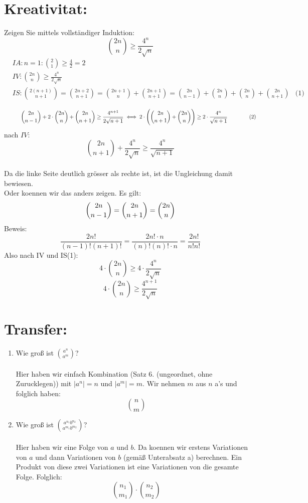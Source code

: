     \section*{Kreativitat:} 
    Zeigen Sie mittels vollständiger Induktion:
    \[\binom{2n}{n}\geq \frac{4^n}{2\sqrt n}\]
    \begin{align*}
        &IA: n=1: \binom{2}{1}\geq \frac{4}{2} = 2\\ %
        &IV: \binom{2n}{n}\geq \frac{4^n}{2\sqrt n}\\
        &IS: \binom{2(n+1)}{n+1}=\binom{2n+2}{n+1}
        = \binom{2n+1}{n} + \binom{2n+1}{n+1}
        = \binom{2n}{n-1} + \binom{2n}{n} + \binom{2n}{n} + \binom{2n}{n+1} &\textrm{(1)}\\
    \end{align*}
    \[\hspace{30pt}\binom{2n}{n-1} + 2\cdot\binom{2n}{n} + \binom{2n}{n+1} \geq \frac{4^{n+1}}{2\sqrt {n+1}}\\
    \iff 2\cdot\Bigg(\binom{2n}{n+1} + \binom{2n}{n}\Bigg) \geq 2\cdot\frac{4^n}{\sqrt {n+1}} 
    \textrm{\hspace{40pt}(2)}\\\]
    nach $IV$: \[ \binom{2n}{n+1} + \frac{4^n}{2\sqrt{n}} \geq \frac{4^n}{\sqrt {n+1}} \]\\
    Da die linke Seite deutlich grösser als rechte ist, ist die Ungleichung damit bewiesen.\\
    Oder koennen wir das anders zeigen. Es gilt:
    \[ \binom{2n}{n-1} = \binom{2n}{n+1} = \binom{2n}{n}\\\]
    Beweis: 
    \[\frac{2n!}{(n-1)!(n+1)!} = \frac{2n!\cdot n}{(n)!(n)! \cdot n} =  \frac{2n!}{n!n!}\]
    Also nach IV und IS(1):
    \[4\cdot\binom{2n}{n} \geq 4\cdot\frac{4^n}{2\sqrt{n}} \]
    \[4\cdot\binom{2n}{n} \geq \frac{4^{n+1}}{2\sqrt{n}} \]
    \section*{Transfer:}
    \begin{enumerate}[label=(\alph*)]
        \item Wie groß ist $\binom{a^n}{a^m}$? \\\\
        Hier haben wir einfach Kombination (Satz 6. (ungeordnet, ohne Zurucklegen)) mit $|a^n| = n$ und 
        $|a^m| = m$. Wir nehmen $m$ aus $n$ a's und folglich haben: 
        \[\binom{n}{m}\]

        \item Wie groß ist $\binom{a^{n_1}b^{n_2}}{a^{m_1}b^{m_2}}$? \\\\
        Hier haben wir eine Folge von $a$ und $b$. Da koennen wir erstens Variationen von $a$ und dann 
        Variationen von $b$ (gemäß Unterabsatz a) berechnen. Ein Produkt von diese zwei Variationen ist 
        eine Variationen von die gesamte Folge. Folglich:
        \[\binom{n_1}{m_1} \cdot \binom{n_2}{m_2} \]
    \end{enumerate} 
